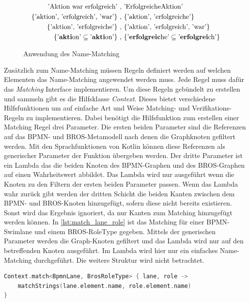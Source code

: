 \begin{figure}
    \centering
    \begin{align}
        \text{'Aktion war erfolgreich'}\ ,&\ \text{'ErfolgreicheAktion'} \label{eq:name_matching_1}\\
        \text{\{'aktion', 'erfolgreich', 'war'\}}\ ,&\ \text{\{'aktion', 'erfolgreiche'\}} \label{eq:name_matching_2}\\
        \text{\{'aktion', 'erfolgreiche'\}}\ ,&\ \text{\{'aktion', 'erfolgreich', 'war'\}} \label{eq:name_matching_3}\\
        \text{\{'\textbf{akti}on'} \subseteq \text{'\textbf{akti}on'\}}\ ,&\ \text{\{'\textbf{erfolgreic}he'} \subseteq \text{'\textbf{erfolgrei}ch'\}} \label{eq:name_matching_4}
    \end{align}
    \caption{Anwendung des Name-Matching}
    \label{eq:name_matching}
\end{figure}

Zusätzlich zum Name-Matching müssen Regeln definiert werden auf welchen Elementen das Name-Matching angewendet werden muss.
Jede Regel muss dafür das \emph{Matching} Interface implementieren.
Um diese Regeln gebündelt zu erstellen und sammeln gibt es die Hilfsklasse \emph{Context}.
Dieses bietet verschiedene Hilfsfunktionen um auf einfache Art und Weise Matching- und Verifikations-Regeln zu implementieren.
Dabei benötigt die Hilfsfunktion zum erstellen einer Matching Regel drei Parameter.
Die ersten beiden Parameter sind die Referenzen auf das BPMN- und BROS-Metamodell nach denen die Graphknoten gefiltert werden.
Mit den Sprachfunktionen von Kotlin können diese Referenzen als generischer Parameter der Funktion übergeben werden.
Der dritte Parameter ist ein Lambda das die beiden Knoten des BPMN-Graphen und des BROS-Graphen auf einen Wahrheitswert abbildet.
Das Lambda wird nur ausgeführt wenn die Knoten zu den Filtern der ersten beiden Parameter passen.
Wenn das Lambda wahr zurück gibt werden der dritten Schicht die beiden Kanten zwischen dem BPMN- und BROS-Knoten hinzugefügt, sofern diese nicht bereits existieren.
Sonst wird das Ergebnis ignoriert, da nur Kanten zum Matching hinzugefügt werden können.
In \cref{lst:match_lane_role} ist das Matching für einer BPMN-Swimlane und einem BROS-RoleType gegeben.
Mittels der generischen Parameter werden die Graph-Knoten gefiltert und das Lambda wird nur auf den betreffenden Knoten ausgeführt. 
Im Lambda wird hier nur ein einfaches Name-Matching durchgeführt.
Die weitere Struktur wird nicht betrachtet.

\begin{lstlisting}[language=Kotlin, caption=Matching Regel von einer BPMN-SwimLane und einem BROS-RoleType, label=lst:match_lane_role]
Context.match<BpmnLane, BrosRoleType> { lane, role ->
    matchStrings(lane.element.name, role.element.name)
}
\end{lstlisting}

